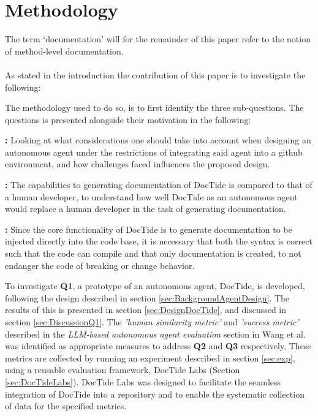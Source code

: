 \newcommand\itemb{\item[\textbf{Q2:}]}
\newcommand\itemc{\item[\textbf{Q3:}]}

\section{Methodology}
\label{sec:method}
The term `documentation' will for the remainder of this paper refer to the notion of method-level documentation.
\\ \\
As stated in the introduction the contribution of this paper is to investigate the following:
\begin{quote}
    \researchQuestion
\end{quote}
The methodology used to do so, is to first identify the three sub-questions. The questions is presented alongside their motivation in the following:

\begin{qlist}
    \item \subquestionI\textbf{:}
    Looking at what considerations one should take into account when designing an autonomous agent under the restrictions of integrating said agent into a github environment, and how challenges faced influences the proposed design.
    \itemb \subquestionII\textbf{:}
    The capabilities to generating documentation of DocTide is compared to that of a human developer, to understand how well DocTide as an autonomous agent would replace a human developer in the task of generating documentation.
    \itemc \subquestionIII\textbf{:}
    Since the core functionality of DocTide is to generate documentation to be injected directly into the code base, it is necessary that both the syntax is correct such that the code can compile and that only documentation is created, to not endanger the code of breaking or change behavior.
\end{qlist}

\noindent
To investigate \textbf{Q1}, a prototype of an autonomous agent, DocTide, is developed, following the design described in section \ref{sec:BackgroundAgentDesign}. The results of this is presented in section \ref{sec:DesignDocTide}, and discussed in section \ref{sec:DiscussionQ1}. The \textit{'human similarity metric'} and \textit{'success metric'} described in the \textit{LLM-based autonomous agent evaluation} section in Wang et al.\cite{wang2024survey} was identified as appropriate measures to address \textbf{Q2} and \textbf{Q3} respectively. These metrics are collected by running an experiment described in section \ref{sec:exp}, using a reusable evaluation framework, DocTide Labs (Section \ref{sec:DocTideLabs}). DocTide Labs was designed to facilitate the seamless integration of DocTide into a repository and to enable the systematic collection of data for the specified metrics.

